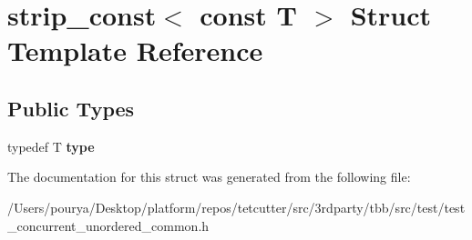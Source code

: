\hypertarget{structstrip__const_3_01const_01T_01_4}{}\section{strip\+\_\+const$<$ const T $>$ Struct Template Reference}
\label{structstrip__const_3_01const_01T_01_4}
\subsection*{Public Types}
\begin{DoxyCompactItemize}
\item 
\hypertarget{structstrip__const_3_01const_01T_01_4_a11c9e2342270e3f11861dbd6c187eeae}{}typedef T {\bfseries type}\label{structstrip__const_3_01const_01T_01_4_a11c9e2342270e3f11861dbd6c187eeae}

\end{DoxyCompactItemize}


The documentation for this struct was generated from the following file\+:\begin{DoxyCompactItemize}
\item 
/\+Users/pourya/\+Desktop/platform/repos/tetcutter/src/3rdparty/tbb/src/test/test\+\_\+concurrent\+\_\+unordered\+\_\+common.\+h\end{DoxyCompactItemize}
